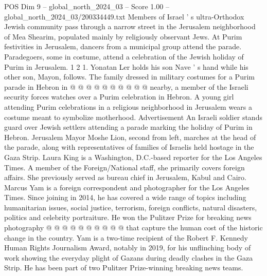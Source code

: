\begin{textsample}{POS Dim 9 – global\_north\_2024\_03 – Score 1.00 – global\_north\_2024\_03/200334449.txt}
Members of Israel ' s ultra-Orthodox Jewish community pass through a narrow street in the Jerusalem neighborhood of Mea Shearim, populated mainly by religiously observant Jews.
At Purim festivities in Jerusalem, dancers from a municipal group attend the parade.
Paradegoers, some in costume, attend a celebration of the Jewish holiday of Purim in Jerusalem. 1 2 1.
Yonatan Ler holds his son Nave ' s hand while his other son, Mayon, follows.
The family dressed in military costumes for a Purim parade in Hebron in @ @ @ @ @ @ @ @ @ @ nearby, a member of the Israeli security forces watches over a Purim celebration in Hebron.
A young girl attending Purim celebrations in a religious neighborhood in Jerusalem wears a costume meant to symbolize motherhood.
Advertisement An Israeli soldier stands guard over Jewish settlers attending a parade marking the holiday of Purim in Hebron.
Jerusalem Mayor Moshe Lion, second from left, marches at the head of the parade, along with representatives of families of Israelis held hostage in the Gaza Strip.
Laura King is a Washington, D.C.-based reporter for the Los Angeles Times.
A member of the Foreign/National staff, she primarily covers foreign affairs.
She previously served as bureau chief in Jerusalem, Kabul and Cairo.
Marcus Yam is a foreign correspondent and photographer for the Los Angeles Times.
Since joining in 2014, he has covered a wide range of topics including humanitarian issues, social justice, terrorism, foreign conflicts, natural disasters, politics and celebrity portraiture.
He won the Pulitzer Prize for breaking news photography @ @ @ @ @ @ @ @ @ @ that capture the human cost of the historic change in the country.
Yam is a two-time recipient of the Robert F.
Kennedy Human Rights Journalism Award, notably in 2019, for his unflinching body of work showing the everyday plight of Gazans during deadly clashes in the Gaza Strip.
He has been part of two Pulitzer Prize-winning breaking news teams.

\end{textsample}

